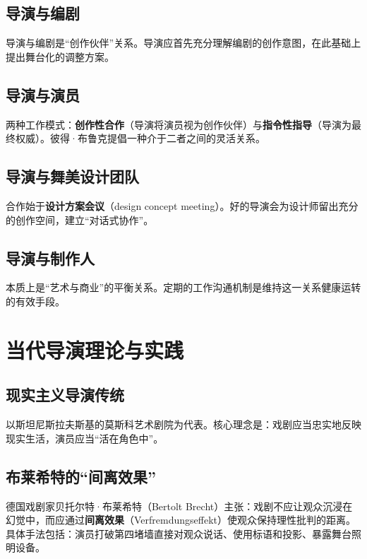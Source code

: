 \subsection{导演与编剧}

导演与编剧是\enquote{创作伙伴}关系。导演应首先充分理解编剧的创作意图，在此基础上提出舞台化的调整方案。

\subsection{导演与演员}

两种工作模式：\textbf{创作性合作}（导演将演员视为创作伙伴）与\textbf{指令性指导}（导演为最终权威）。彼得·布鲁克提倡一种介于二者之间的灵活关系\cite{brook:space}。

\subsection{导演与舞美设计团队}

合作始于\textbf{设计方案会议}（design concept meeting）。好的导演会为设计师留出充分的创作空间，建立\enquote{对话式协作}。

\subsection{导演与制作人}

本质上是\enquote{艺术与商业}的平衡关系。定期的工作沟通机制是维持这一关系健康运转的有效手段。

\section{当代导演理论与实践}

\subsection{现实主义导演传统}

以斯坦尼斯拉夫斯基的莫斯科艺术剧院为代表。核心理念是：戏剧应当忠实地反映现实生活，演员应当\enquote{活在角色中}\cite{stanislavski:life}。

\subsection{布莱希特的\enquote{间离效果}}

德国戏剧家贝托尔特·布莱希特（Bertolt Brecht）主张：戏剧不应让观众沉浸在幻觉中，而应通过\textbf{间离效果}（Verfremdungseffekt）使观众保持理性批判的距离。具体手法包括：演员打破第四堵墙直接对观众说话、使用标语和投影、暴露舞台照明设备\cite{brecht:tools}。

